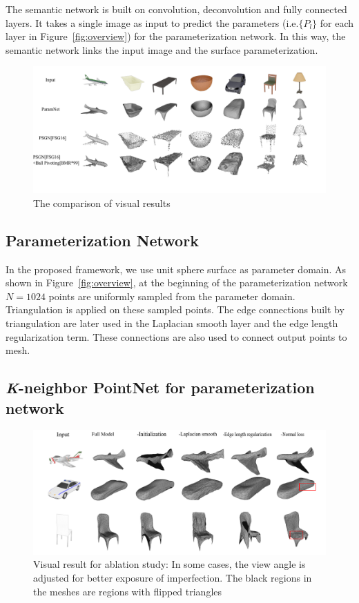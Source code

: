 The semantic network is built on convolution, deconvolution and fully connected layers. It takes a single image as input to predict the parameters (i.e.$\{P_l\}$ for each layer in Figure~\ref{fig:overview}) for the parameterization network. 
In this way, the semantic network links the input image and the surface parameterization.

\begin{figure}[htbp]
	\centering
	\includegraphics[width=\linewidth]{img/res/res}
	\caption{The comparison of visual results}
	\label{fig:res}
\end{figure}

\subsection{Parameterization Network}
In the proposed framework, we use unit sphere surface as parameter domain.
As shown in Figure~\ref{fig:overview}, at the beginning of the parameterization network $N=1024$ points are uniformly sampled from the parameter domain. Triangulation is applied on these sampled points. 
The edge connections built by triangulation are later used in the Laplacian smooth layer and the edge length regularization term. 
These connections are also used to connect output points to mesh.
 
\subsection{\textit{K}-neighbor PointNet for parameterization network} 
\label{subsec:k-n_point_net}

\begin{figure}[htbp]
	\centering
	\includegraphics[width=\linewidth]{img/abl/abl}
	\caption{Visual result for ablation study: In some cases, the view angle is adjusted for better exposure of imperfection. The black regions in the meshes are regions with flipped triangles}
	\label{fig:abl}
\end{figure}

